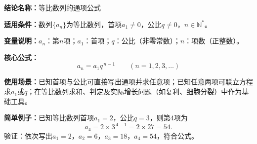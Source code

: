 \textbf{结论名称：}等比数列的通项公式

\textbf{适用条件：}数列\(\{a_n\}\)为等比数列，首项\(a_1\neq0\)，公比\(q\neq0\)，\(n\in\mathbb{N}^*\)。

\textbf{变量说明：}\(a_n\)：第\(n\)项；\(a_1\)：首项；\(q\)：公比（非零常数）；\(n\)：项数（正整数）。

\textbf{核心公式：}\[\boxed{a_n = a_1 q^{\,n-1}}\qquad (n=1,2,3,\dots)\]

\textbf{使用场景：}已知首项与公比可直接写出通项并求任意项；已知任意两项可联立方程求\(a_1\)或\(q\)；在等比数列求和、判定及实际增长问题（如复利、细胞分裂）中作为基础工具。

\textbf{简单例子：}已知等比数列首项\(a_1=2\)，公比\(q=3\)，则第\(4\)项为
\[a_4 = 2 \times 3^{\,4-1} = 2 \times 27 = 54.\]
验证：依次写出\(a_1=2\)，\(a_2=6\)，\(a_3=18\)，\(a_4=54\)，符合公式。